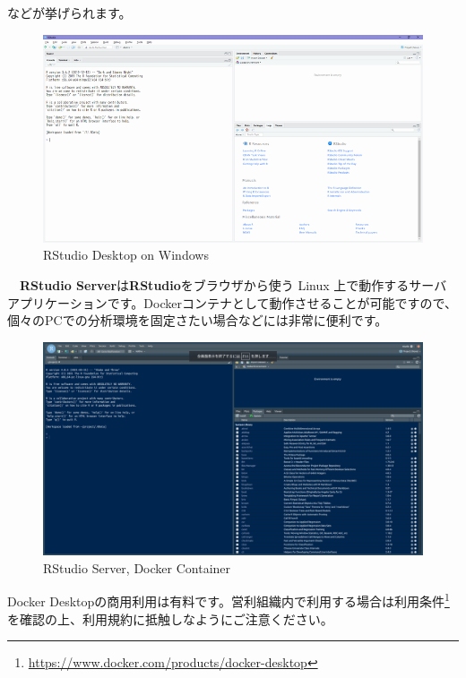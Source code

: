 \documentclass[
  12pt,
]{book}
\DeclareRobustCommand{\href}[2]{#2\footnote{\url{#1}}}
\begin{document}
などが挙げられます。

\begin{figure}[H]

{\centering \includegraphics[width=0.9\linewidth,]{./fig/RStudio/DT} 

}

\caption{RStudio Desktop on Windows}\label{fig:unnamed-chunk-16}
\end{figure}

　\textbf{RStudio Server}は\textbf{RStudio}をブラウザから使う Linux 上で動作するサーバアプリケーションです。Dockerコンテナとして動作させることが可能ですので、個々のPCでの分析環境を固定さたい場合などには非常に便利です。

\begin{figure}[H]

{\centering \includegraphics[width=0.9\linewidth,]{./fig/RStudio/RStudioServer} 

}

\caption{RStudio Server, Docker Container}\label{fig:unnamed-chunk-17}
\end{figure}

\begin{hint-box}
Docker Desktopの商用利用は有料です。営利組織内で利用する場合は\href{https://www.docker.com/products/docker-desktop}{利用条件}を確認の上、利用規約に抵触しなようにご注意ください。

\end{hint-box}
\end{document}
